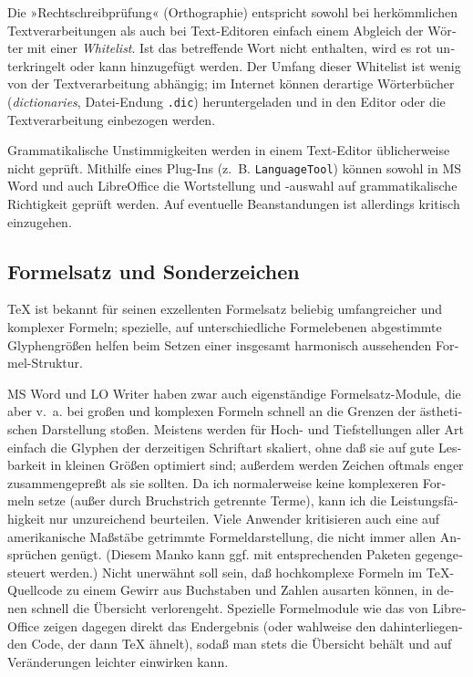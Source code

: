 \documentclass[11pt,a4paper,ngerman,french,DIV=8]{scrartcl}
\begin{document}
\begin{otherlanguage}{ngerman}
Die »Rechtschreibprüfung« (Orthographie) entspricht sowohl bei herkömmlichen Textverarbeitungen als auch bei Text-Editoren einfach einem Abgleich der Wörter mit einer \emph{Whitelist}. Ist das betreffende Wort nicht enthalten, wird es rot unterkringelt oder kann hinzugefügt werden. Der Umfang dieser Whitelist ist wenig von der Textverarbeitung abhängig; im Internet können derartige Wörterbücher (\emph{dictionaries}, Datei-Endung \texttt{.dic}) heruntergeladen und in den Editor oder die Textverarbeitung einbezogen werden.

Grammatikalische Unstimmigkeiten werden in einem Text-Editor üblicherweise nicht geprüft. Mithilfe eines Plug-Ins (z.~B. \texttt{LanguageTool}) können sowohl in MS Word und auch LibreOffice die Wortstellung und -auswahl auf grammatikalische Richtigkeit geprüft werden. Auf eventuelle Beanstandungen ist allerdings kritisch einzugehen.

\subsection{Formelsatz und Sonderzeichen}

\TeX{} ist bekannt für seinen exzellenten Formelsatz beliebig umfangreicher und komplexer Formeln; spezielle, auf unterschiedliche Formelebenen abgestimmte Glyphengrößen helfen beim Setzen einer insgesamt harmonisch aussehenden Formel-Struktur.

MS Word und LO Writer haben zwar auch eigenständige Formelsatz-Module, die aber v.~a. bei großen und komplexen Formeln schnell an die Grenzen der ästhetischen Darstellung stoßen. Meistens werden für Hoch- und Tiefstellungen aller Art einfach die Glyphen der derzeitigen Schriftart skaliert, ohne daß sie auf gute Lesbarkeit in kleinen Größen optimiert sind; außerdem werden Zeichen oftmals enger zusammengepreßt als sie sollten. Da ich normalerweise keine komplexeren Formeln setze (außer durch Bruchstrich getrennte Terme), kann ich die Leistungsfähigkeit nur unzureichend beurteilen. Viele Anwender kritisieren auch eine auf amerikanische Maßstäbe getrimmte Formeldarstellung, die nicht immer allen Ansprüchen genügt. (Diesem Manko kann ggf. mit entsprechenden Paketen gegengesteuert werden.) Nicht unerwähnt soll sein, daß hochkomplexe Formeln im \TeX{}-Quellcode zu einem Gewirr aus Buchstaben und Zahlen ausarten können, in denen schnell die Übersicht verlorengeht. Spezielle Formelmodule wie das von LibreOffice zeigen dagegen direkt das Endergebnis (oder wahlweise den dahinterliegenden Code, der dann \TeX{} ähnelt), sodaß man stets die Übersicht behält und auf Veränderungen leichter einwirken kann.


\end{otherlanguage}
\end{document}
